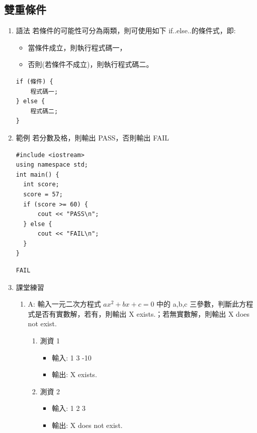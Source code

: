 \documentclass[a4paper,12pt]{article}
\begin{document}
\subsection{雙重條件}
\label{sec:orgcdff382}
\begin{enumerate}
\item 語法
\label{sec:orge1fca6d}
若條件的可能性可分為兩類，則可使用如下 if..else..的條件式，即:\\
\begin{itemize}
\item 當條件成立，則執行程式碼一，\\
\item 否則(若條件不成立)，則執行程式碼二。\\
\end{itemize}
\lstset{breaklines=true,language=cpp,label= ,caption= ,captionpos=b,numbers=none}
\begin{lstlisting}
if (條件) {
    程式碼一;
} else {
    程式碼二;
}
\end{lstlisting}

\item 範例
\label{sec:org034850b}
若分數及格，則輸出 PASS，否則輸出 FAIL\\
\lstset{breaklines=true,language=cpp,label= ,caption= ,captionpos=b,firstnumber=1,numbers=left}
\begin{lstlisting}
#include <iostream>
using namespace std;
int main() {
  int score;
  score = 57;
  if (score >= 60) {
      cout << "PASS\n";
  } else {
      cout << "FAIL\n";
  }
}
\end{lstlisting}

\begin{verbatim}
FAIL
\end{verbatim}
\item 課堂練習
\label{sec:org639602f}
\begin{enumerate}
\item A: 輸入一元二次方程式 \(ax^2+bx+c=0\) 中的 a,b,c 三參數，判斷此方程式是否有實數解，若有，則輸出 X exists.；若無實數解，則輸出 X does not exist.
\label{sec:org964ab84}
\begin{enumerate}
\item 測資 1
\label{sec:org881f393}
\begin{itemize}
\item 輸入: 1 3 -10\\
\item 輸出: X exists.\\
\end{itemize}
\item 測資 2
\label{sec:org00bb899}
\begin{itemize}
\item 輸入: 1 2 3\\
\item 輸出: X does not exist.\\
\end{itemize}
\end{enumerate}
\end{enumerate}
\end{enumerate}
\end{document}

